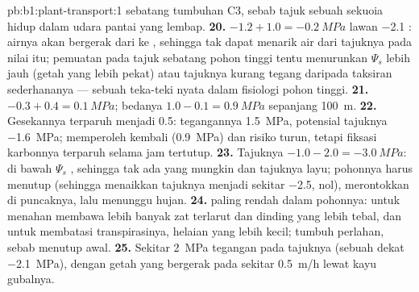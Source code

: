 \begin{solution}{pb:b1:plant-transport:1}
sebatang tumbuhan C3, sebab tajuk sebuah sekuoia hidup dalam udara
pantai yang lembap.
\textbf{20.} $-1.2 + 1.0 = \qty{-0.2}{MPa}$ lawan \qty{-2.1}{}
: airnya akan bergerak dari  ke , sehingga 
tak dapat menarik air dari  tajuknya pada nilai itu; pemuatan
pada tajuk sebatang pohon tinggi tentu menurunkan $\Psi_s$ 
lebih jauh (getah yang lebih pekat) atau  tajuknya kurang tegang
daripada taksiran sederhananya --- sebuah teka-teki nyata dalam
fisiologi pohon tinggi.
\textbf{21.} $-0.3 + 0.4 = \qty{0.1}{MPa}$; bedanya $1.0 - 0.1 =
\qty{0.9}{MPa}$ sepanjang \qty{100}{m}.
\textbf{22.} Gesekannya terparuh menjadi \qty{0.5}{}: tegangannya
\qty{1.5}{MPa}, potensial tajuknya \qty{-1.6}{MPa};  memperoleh
kembali  (\qty{0.9}{MPa}) dan risiko  turun, tetapi
fiksasi karbonnya terparuh selama jam  tertutup.
\textbf{23.} Tajuknya $-1.0 - 2.0 = \qty{-3.0}{MPa}$: di bawah $\Psi_s$
, sehingga tak ada  yang mungkin dan tajuknya layu;
pohonnya harus menutup  (sehingga menaikkan tajuknya menjadi
sekitar \qty{-2.5}{},  nol), merontokkan  di puncaknya, lalu
menunggu hujan.
\textbf{24.}  paling rendah dalam pohonnya: untuk
menahan   membawa lebih banyak zat terlarut dan dinding
yang lebih tebal, dan untuk membatasi transpirasinya, helaian yang
lebih kecil;  tumbuh perlahan, sebab  menutup awal.
\textbf{25.} Sekitar \qty{2}{MPa} tegangan pada tajuknya (sebuah
 dekat \qty{-2.1}{MPa}), dengan getah yang bergerak pada
sekitar \qty{0.5}{m/h} lewat kayu gubalnya.
\end{solution}
